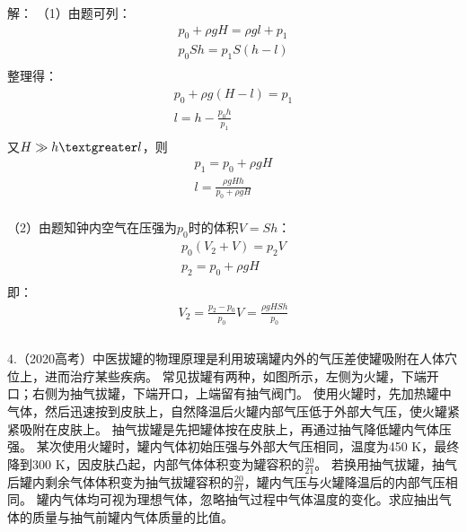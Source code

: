 \documentclass[UTF8]{ctexart}
\begin{document}
 解：
（1）由题可列：
\begin{gather*}
    p_{0} + \rho gH = \rho gl + p_{1}\\
    p_{0}Sh = p_{1}S(h-l)\\
\end{gather*}
整理得：
\begin{gather*}
    p_{0} + \rho g(H-l) = p_{1}\\
    l = h - \frac{p_{0}h}{p_{1}}\\
\end{gather*}
又$H \gg h \textgreater l$，则
\begin{gather*}
    p_{1} = p_{0} + \rho gH\\
    l = \frac{\rho gHh}{p_{0} + \rho gH}\\
\end{gather*}

（2）由题知钟内空气在压强为$p_{0}$时的体积$V = Sh$：
\begin{gather*}
    p_{0}(V_{2} + V) = p_{2}V\\
    p_{2} = p_{0} + \rho gH\\
\end{gather*}
即：
\begin{gather*}
    V_{2} = \frac{p_{2} - p_{0}}{p_{0}} V = \frac{\rho gHSh}{p_{0}}\\
\end{gather*}

\paragraph{}


\paragraph{}
    4.（2020高考）中医拔罐的物理原理是利用玻璃罐内外的气压差使罐吸附在人体穴位上，进而治疗某些疾病。
    常见拔罐有两种，如图所示，左侧为火罐，下端开口；右侧为抽气拔罐，下端开口，上端留有抽气阀门。
    使用火罐时，先加热罐中气体，然后迅速按到皮肤上，自然降温后火罐内部气压低于外部大气压，使火罐紧紧吸附在皮肤上。
    抽气拔罐是先把罐体按在皮肤上，再通过抽气降低罐内气体压强。
    某次使用火罐时，罐内气体初始压强与外部大气压相同，温度为450 K，最终降到300 K，因皮肤凸起，内部气体体积变为罐容积的$\frac{20}{21}$。
    若换用抽气拔罐，抽气后罐内剩余气体体积变为抽气拔罐容积的$\frac{20}{21}$，罐内气压与火罐降温后的内部气压相同。
    罐内气体均可视为理想气体，忽略抽气过程中气体温度的变化。求应抽出气体的质量与抽气前罐内气体质量的比值。
\end{document}
